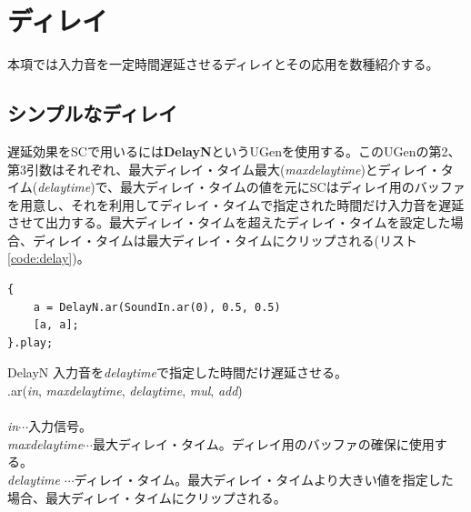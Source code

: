 \documentclass{jsarticle}
\begin{document}
\section{ディレイ}
本項では入力音を一定時間遅延させるディレイとその応用を数種紹介する。

\subsection{シンプルなディレイ}

遅延効果をSCで用いるには{\bf DelayN}というUGenを使用する。このUGenの第2、第3引数はそれぞれ、最大ディレイ・タイム最大({\it maxdelaytime})とディレイ・タイム({\it delaytime})で、最大ディレイ・タイムの値を元にSCはディレイ用のバッファを用意し、それを利用してディレイ・タイムで指定された時間だけ入力音を遅延させて出力する。最大ディレイ・タイムを超えたディレイ・タイムを設定した場合、ディレイ・タイムは最大ディレイ・タイムにクリップされる(リスト\ref{code:delay})。
\begin{lstlisting}[caption=ディレイ, label=code:delay]
{
	a = DelayN.ar(SoundIn.ar(0), 0.5, 0.5)
	[a, a];
}.play;
\end{lstlisting}

\begin{itembox}[l]{DelayN}
	{\footnotesize 
	入力音を{\it delaytime}で指定した時間だけ遅延させる。\\
	.ar({\it in}, {\it maxdelaytime}, {\it delaytime}, {\it mul}, {\it add})\\\\
	{\it in}$\cdots$入力信号。\\
	{\it maxdelaytime}$\cdots$最大ディレイ・タイム。ディレイ用のバッファの確保に使用する。\\
	{\it delaytime} $\cdots$ディレイ・タイム。最大ディレイ・タイムより大きい値を指定した場合、最大ディレイ・タイムにクリップされる。
	}
\end{itembox}
\end{document}
